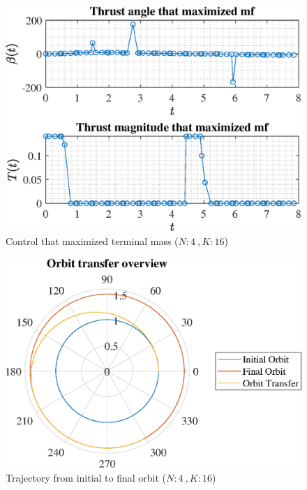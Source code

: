 \documentclass[]{article}
\begin{document}
	\begin{figure}
		\centering
		\includegraphics[scale=0.75]{control_N4_K16_C2_mf.eps}
		\caption{Control that maximized terminal mass (\(N:4\ , K:16\))}
		\label{fig:control_N4_K16_C2_mf}
	\end{figure}
	\begin{figure}
		\centering
		\includegraphics[scale=0.75]{orbit_N4_K16_C2_mf.eps}
		\caption{Trajectory from initial to final orbit (\(N:4\ , K:16\))}
		\label{fig:orbit_N4_K16_C2_mf}
	\end{figure}
\end{document}
